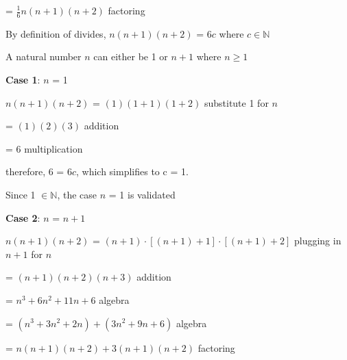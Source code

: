 \documentclass{article} %
\begin{document}
    \tabto*{2.57cm} = $\frac{1}{6}n(n + 1)(n + 2)$ \tabto*{6cm}factoring
    
    \vspace*{0.08cm}

    By definition of divides, $n(n + 1)(n + 2)$ = 6$c$ where $c \in \mathbb{N}$

    A natural number $n$ can either be 1 or $n+1$ where $n \geq 1$

    \vspace*{0.2cm}

    \textbf{Case 1}: $n$ = 1

    \tabto*{1cm}$n(n + 1)(n + 2)$ = $(1)(1 + 1)(1 + 2)$ \tabto*{7.3cm}substitute 1 for $n$

    \vspace*{0.08cm}

    \tabto*{1cm}\tabto*{3.51cm} = $(1)(2)(3)$ \tabto*{7.3cm}addition
    
    \vspace*{0.08cm}

    \tabto*{1cm}\tabto*{3.51cm} = $6$ \tabto*{7.3cm}multiplication
    
    \vspace*{0.08cm}

    \tabto*{1cm}therefore, 6 = 6$c$, which simplifies to c = 1.

    \tabto*{1cm}Since 1 $\in \mathbb{N}$, the case $n$ = 1 is validated

    \vspace*{0.2cm}
    
    \textbf{Case 2}: $n$ = $n + 1$
    \vspace*{0.08cm}

    \tabto*{1cm}$n(n + 1)(n + 2)$ = $(n + 1)\cdot [(n + 1) + 1]\cdot [(n + 1) + 2]$ \tabto*{9.6cm}plugging in $n+1$ for $n$
    \vspace*{0.08cm}

    \tabto*{3.51cm} = $(n + 1)(n + 2)(n + 3)$ \tabto*{9.6cm}addition
    \vspace*{0.08cm}

    \tabto*{3.51cm} = $n^3 + 6n^2 + 11n + 6$ \tabto*{9.6cm}algebra
    \vspace*{0.08cm}

    \tabto*{3.51cm} = $(n^3 +3n^2 + 2n) + (3n^2 + 9n + 6)$ \tabto*{9.6cm}algebra
    \vspace*{0.08cm}

    \tabto*{3.51cm} = $n(n+1)(n+2) + 3(n+1)(n+2)$ \tabto*{9.6cm}factoring
    \vspace*{0.08cm}
\end{document}
